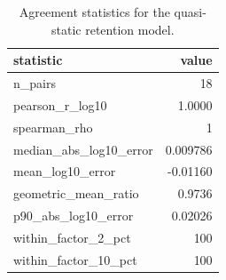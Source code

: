 \begin{table}[!t]
\centering
\caption{Agreement statistics for the quasi-static retention model.}
\label{tab:validation_retention_agreement}
\footnotesize
\begin{tabular}{lr}
\toprule
statistic & value \\
\midrule
n\_pairs & 18 \\
pearson\_r\_log10 & 1.0000 \\
spearman\_rho & 1 \\
median\_abs\_log10\_error & 0.009786 \\
mean\_log10\_error & -0.01160 \\
geometric\_mean\_ratio & 0.9736 \\
p90\_abs\_log10\_error & 0.02026 \\
within\_factor\_2\_pct & 100 \\
within\_factor\_10\_pct & 100 \\
\bottomrule
\end{tabular}
\end{table}
